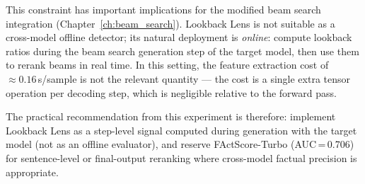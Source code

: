 This constraint has important implications for the modified beam search integration
(Chapter~\ref{ch:beam_search}).  Lookback Lens is not suitable as a cross-model
offline detector; its natural deployment is \emph{online}: compute lookback ratios during
the beam search generation step of the target model, then use them to rerank beams in
real time.  In this setting, the feature extraction cost of ${\approx}0.16$\,s/sample
is not the relevant quantity — the cost is a single extra tensor operation per decoding
step, which is negligible relative to the forward pass.

The practical recommendation from this experiment is therefore: implement Lookback Lens
as a step-level signal computed during generation with the target model (not as an
offline evaluator), and reserve FActScore-Turbo (AUC\,=\,0.706) for sentence-level or
final-output reranking where cross-model factual precision is appropriate.
